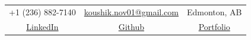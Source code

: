 \documentclass[11pt,a4paper,sans]{moderncv}
\begin{document}
\makecvtitle
\vspace*{-12mm}
\begin{center}
	\begin{tabular}{ c c c }
		\faMobile\enspace +1 (236) 882-7140 & \enspace\faEnvelope\enspace \href{mailto:koushik.nov01@gmail.com}{koushik.nov01@gmail.com} & \enspace\faHome\enspace Edmonton, AB\\[2mm]
		\faLinkedin\enspace \href{https://www.linkedin.com/in/koushik-sivarama-krishnan/}{\textcolor{customblue}{LinkedIn}} & \faGithub\enspace \href{https://github.com/Koushik0901}{\textcolor{customblue}{Github}} & \faGlobe\enspace \href{https://koushik0901.github.io/}{\textcolor{customblue}{Portfolio}}
	\end{tabular}
\end{center}




\end{document}
